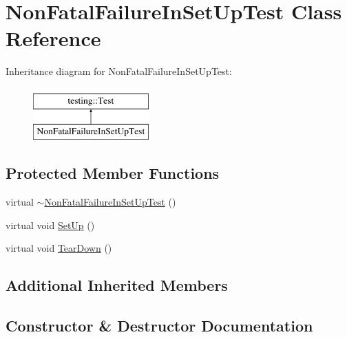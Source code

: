 \hypertarget{classNonFatalFailureInSetUpTest}{}\section{Non\+Fatal\+Failure\+In\+Set\+Up\+Test Class Reference}
\label{classNonFatalFailureInSetUpTest}
Inheritance diagram for Non\+Fatal\+Failure\+In\+Set\+Up\+Test\+:\begin{figure}[H]
\begin{center}
\leavevmode
\includegraphics[height=2.000000cm]{classNonFatalFailureInSetUpTest}
\end{center}
\end{figure}
\subsection*{Protected Member Functions}
\begin{DoxyCompactItemize}
\item 
virtual \mbox{\hyperlink{classNonFatalFailureInSetUpTest_ae4b4ee1812e3427cf82b155256547442}{$\sim$\+Non\+Fatal\+Failure\+In\+Set\+Up\+Test}} ()
\item 
virtual void \mbox{\hyperlink{classNonFatalFailureInSetUpTest_ae24c724bae1fcd2601f58fa9c26adca3}{Set\+Up}} ()
\item 
virtual void \mbox{\hyperlink{classNonFatalFailureInSetUpTest_a36abc808b11afc6a9bfa20dac5c28c30}{Tear\+Down}} ()
\end{DoxyCompactItemize}
\subsection*{Additional Inherited Members}


\subsection{Constructor \& Destructor Documentation}
\mbox{\label{classNonFatalFailureInSetUpTest_ae4b4ee1812e3427cf82b155256547442}} 

